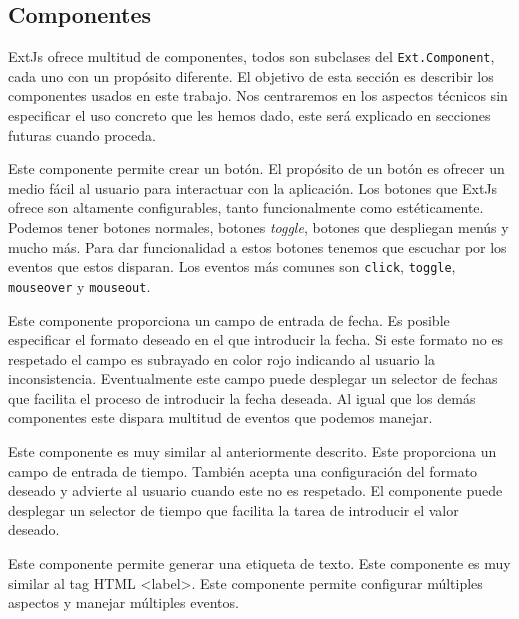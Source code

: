 	\subsection{Componentes}  %
		ExtJs ofrece multitud de componentes, todos son subclases del \texttt{Ext.Component}, cada uno con un propósito diferente. El objetivo
		de esta sección es describir los componentes usados en este trabajo. Nos centraremos en los aspectos técnicos sin especificar el uso
		concreto que les hemos dado, este será explicado en secciones futuras cuando proceda. 
		\begin{description}[style=unboxed,leftmargin=0cm]
			\item[\texttt{Ext.button.Button xtype:button}] Este componente permite crear un botón. El propósito de un botón es ofrecer un
			  medio fácil al usuario para interactuar con la aplicación. Los botones que ExtJs ofrece son altamente configurables, tanto
			  funcionalmente como estéticamente. Podemos tener botones normales, botones \emph{toggle}, botones que despliegan menús y
			  mucho más. Para dar funcionalidad a estos botones tenemos que escuchar por los eventos que estos disparan. Los eventos más
			  comunes son \texttt{click}, \texttt{toggle}, \texttt{mouseover} y \texttt{mouseout}.
			\item[\texttt{Ext.form.field.Date xtype:datefield}] Este componente proporciona un campo de entrada de fecha. Es posible
			  especificar el formato deseado en el que introducir la fecha. Si este formato no es respetado el campo es subrayado en color
			  rojo indicando al usuario la inconsistencia. Eventualmente este campo puede desplegar un selector de fechas que facilita el
			  proceso de introducir la fecha deseada. Al igual que los demás componentes este dispara multitud de eventos que podemos
			  manejar.
			\item[\texttt{Ext.form.field.Time xtype:timefield}] Este componente es muy similar al anteriormente descrito. Este proporciona
			  un campo de entrada de tiempo. También acepta una configuración del formato deseado y advierte  al usuario cuando este no es
			  respetado. El componente puede desplegar un selector de tiempo que facilita la tarea de introducir el valor deseado.
			\item[\texttt{Ext.form.Label xtype:label}] Este componente permite generar una etiqueta de texto. Este componente es muy
			  similar al tag HTML <label>. Este componente permite configurar múltiples aspectos y manejar múltiples eventos.

\end{description}
